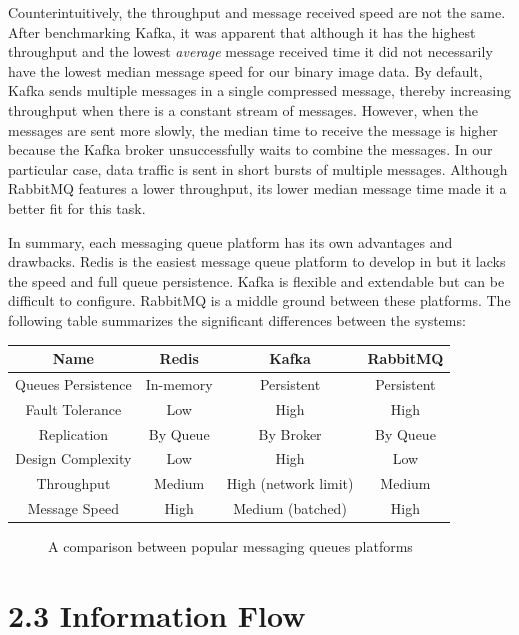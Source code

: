 \documentclass[12pt]{report}
\begin{document}
Counterintuitively, the throughput and message received speed are not the same. After benchmarking Kafka, it was apparent that although it has the highest throughput and the lowest \textit{average} message received time it did not necessarily have the lowest median message speed for our binary image data. By default, Kafka sends multiple messages in a single compressed message, thereby increasing throughput when there is a constant stream of messages. However, when the messages are sent more slowly, the median time to receive the message is higher because the Kafka broker unsuccessfully waits to combine the messages. In our particular case, data traffic is sent in short bursts of multiple messages. Although RabbitMQ features a lower throughput, its lower median message time made it a better fit for this task.\\

\newpage

In summary, each messaging queue platform has its own advantages and drawbacks. Redis is the easiest message queue platform to develop in but it lacks the speed and full queue persistence. Kafka is flexible and extendable but can be difficult to configure. RabbitMQ is a middle ground between these platforms. The following table summarizes the significant differences between the systems:

\begin{center}
\begin{tabular}{ |c|c|c|c| }
 \hline
 \textbf{Name} & \textbf{Redis} & \textbf{Kafka} & \textbf{RabbitMQ} \\ \hline
 Queues Persistence & In-memory & Persistent & Persistent\\ \hline
 Fault Tolerance & Low & High & High\\ \hline
 Replication & By Queue & By Broker  & By Queue \\ \hline
 Design Complexity & Low & High & Low \\ \hline
 Throughput & Medium & High (network limit) & Medium \\ \hline
 Message Speed & High & Medium (batched) & High \\ \hline 
\end{tabular}
\end{center}
\begin{figure}[h]
\caption{A comparison between popular messaging queues platforms}
\end{figure}

\newpage\thispagestyle{fancy}\sectionfont{\scshape}
\section*{2.3 Information Flow}
\par
\end{document}
